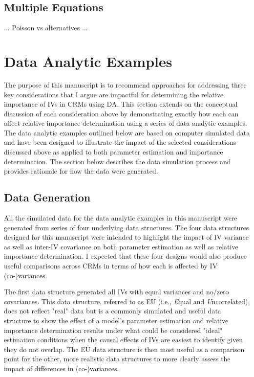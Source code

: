 \documentclass[ShortAfour,times,sageapa]{sagej}
\begin{document}
	
	\subsection{Multiple Equations}
	
	... Poisson vs alternatives ...
	
\section{Data Analytic Examples}
	
	The purpose of this manuscript is to recommend approaches for addressing three key considerations that I argue are impactful for determining the relative importance of IVs in CRMs using DA.
	This section extends on the conceptual discussion of each consideration above by demonstrating exactly how each can affect relative importance determination using a series of data analytic examples. 
	The data analytic examples outlined below are based on computer simulated data and have been designed to illustrate the impact of the selected considerations discussed above as applied to both parameter estimation and importance determination.
	The section below describes the data simulation process and provides rationale for how the data were generated.
	
	\subsection{Data Generation}
	
	All the simulated data for the data analytic examples in this manuscript were generated from series of four underlying data structures.
	The four data structures designed for this manuscript were intended to highlight the impact of IV variance as well as inter-IV covariance on both parameter estimation as well as relative importance determination.
	I expected that these four designs would also produce useful comparisons across CRMs in terms of how each is affected by IV (co-)variances.
	
	The first data structure generated all IVs with equal variances and no/zero covariances.  
	This data structure, referred to as EU (i.e., \emph{E}qual and \emph{U}ncorrelated), does not reflect "real" data but is a commonly simulated and useful data structure to show the effect of a model's parameter estimation and relative importance determination results under what could be considered "ideal" estimation conditions when the causal effects of IVs are easiest to identify given they do not overlap.  
	The EU data structure is then most useful as a comparison point for the other, more realistic data structures to more clearly assess the impact of differences in (co-)variances.
	
\end{document}
